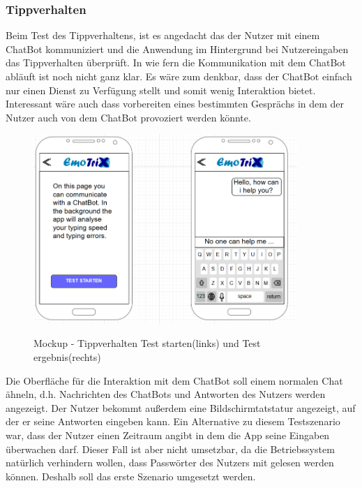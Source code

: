 \subsubsection{Tippverhalten}
Beim Test des Tippverhaltens, ist es angedacht das der Nutzer mit einem ChatBot kommuniziert und die Anwendung im Hintergrund bei Nutzereingaben das Tippverhalten überprüft. In wie fern die Kommunikation mit dem ChatBot abläuft ist noch nicht ganz klar. Es wäre zum denkbar, dass der ChatBot einfach nur einen Dienst zu Verfügung stellt und somit wenig Interaktion bietet. Interessant wäre auch dass vorbereiten eines bestimmten Gesprächs in dem der Nutzer auch von dem ChatBot provoziert werden könnte.
\begin{figure}[h]
	\centering
	\includegraphics[width=10cm]{Bilder/Mockup-Tippverhalten.png}
	\label{img:Mockup-Tippverhalten}
	\caption[Mockup - Tippverhalten Test starten(links) und Test ergebnis(rechts)]{Mockup - Tippverhalten Test starten(links) und Test ergebnis(rechts)}
\end{figure}%
Die Oberfläche für die Interaktion mit dem ChatBot soll einem normalen Chat ähneln, d.h. Nachrichten des ChatBots und Antworten des Nutzers werden angezeigt. Der Nutzer bekommt außerdem eine Bildschirmtatstatur angezeigt, auf der er seine Antworten eingeben kann.\newline
Ein Alternative zu diesem Testszenario war, dass der Nutzer einen Zeitraum angibt in dem die App seine Eingaben überwachen darf. Dieser Fall ist aber nicht umsetzbar, da die Betriebssystem natürlich verhindern wollen, dass Passwörter des Nutzers mit gelesen werden können.
Deshalb soll das erste Szenario umgesetzt werden.\newline \newline \newline \newline
